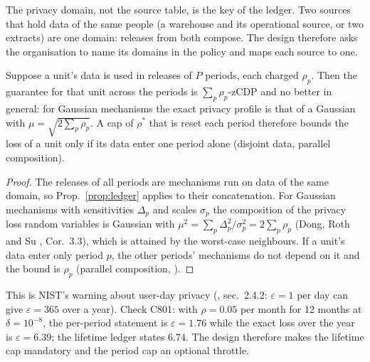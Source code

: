 The privacy domain, not the source table, is the key of the ledger. Two sources that hold data of the same people (a warehouse and its operational source, or two extracts) are one domain: releases from both compose. The design therefore asks the organisation to name its domains in the policy and maps each source to one.

\setcounter{proposition}{800}
\begin{proposition}\label{prop:period}
Suppose a unit's data is used in releases of $P$ periods, each charged $\rho_p$. Then the guarantee for that unit across the periods is $\sum_p\rho_p$-zCDP and no better in general: for Gaussian mechanisms the exact privacy profile is that of a Gaussian with $\mu=\sqrt{2\sum_p\rho_p}$. A cap of $\rho^\ast$ that is reset each period therefore bounds the loss of a unit only if its data enter one period alone (disjoint data, parallel composition).
\end{proposition}
\begin{proof}
The releases of all periods are mechanisms run on data of the same domain, so Prop.~\ref{prop:ledger} applies to their concatenation. For Gaussian mechanisms with sensitivities $\Delta_p$ and scales $\sigma_p$ the composition of the privacy loss random variables is Gaussian with $\mu^2=\sum_p\Delta_p^2/\sigma_p^2=2\sum_p\rho_p$ (Dong, Roth and Su \cite{dong2022}, Cor.~3.3), which is attained by the worst-case neighbours. If a unit's data enter only period $p$, the other periods' mechanisms do not depend on it and the bound is $\rho_p$ (parallel composition, \cite{dworkroth2014}).
\end{proof}
\noindent This is NIST's warning about user-day privacy (\cite{nist800226}, sec.~2.4.2: $\varepsilon=1$ per day can give $\varepsilon=365$ over a year). Check C801: with $\rho=0.05$ per month for 12 months at $\delta=10^{-8}$, the per-period statement is $\varepsilon=1.76$ while the exact loss over the year is $\varepsilon=6.39$; the lifetime ledger states $6.74$. The design therefore makes the lifetime cap mandatory and the period cap an optional throttle.

